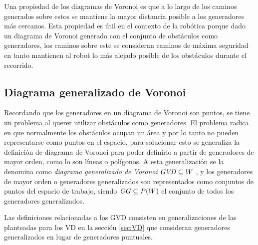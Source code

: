 Una propiedad de los diagramas de Voronoi es que a lo largo de los caminos generados sobre estos se mantiene la mayor distancia posible a los generadores más cercanos.
Esta propiedad es útil en el contexto de la robótica porque dado un diagrama de Voronoi generado con el conjunto de obstáculos como generadores, los caminos sobre este se consideran caminos de máxima seguridad en tanto mantienen al robot lo más alejado posible de los obstáculos durante el recorrido.


\subsection{Diagrama generalizado de Voronoi}\label{subsec:GVD}
Recordando que los generadores en un diagrama de Voronoi son puntos, se tiene un problema al querer utilizar obstáculos como generadores. El problema radica en que normalmente los obstáculos ocupan un área y por lo tanto no pueden representarse como puntos en el espacio, para solucionar esto se generaliza la definición de diagrama de Voronoi para poder definirlo a partir de generadores de mayor orden, como lo son líneas o polígonos. A esta generalización se la denomina como \emph{diagrama generalizado de Voronoi} $\mathit{GVD}\subseteq W$ , y los generadores de mayor orden o generadores generalizados son representados como conjuntos de puntos del espacio de trabajo, siendo $\mathit{GG}\subseteq P(W)$ el conjunto de todos los generadores generalizados.


Las definiciones relacionadas a los GVD consisten en generalizaciones de
las planteadas para los VD en la sección \ref{sec:VD} que consideran
generadores generalizados en lugar de generadores puntuales. 

